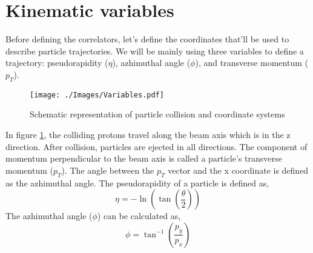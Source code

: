 \documentclass[12pt,a4paper,twoside]{report}
\begin{document}
\section{Kinematic variables}
Before defining the correlators, let's define the coordinates that'll be used to describe particle trajectories. We will be mainly using three variables to define a trajectory: pseudorapidity ($\eta$), azhimuthal angle ($\phi$), and transverse momentum ($p_T$).\\
\begin{figure}[H]
	\texttt{[image: ./Images/Variables.pdf]}
	\caption{Schematic representation of particle collision and coordinate systems}
	\label{fig:Variables}
\end{figure}
In figure \ref{fig:Variables}, the colliding protons travel along the beam axis which is in the z direction. After collision, particles are ejected in all directions. The component of momentum perpendicular to the beam axis is called a particle's transverse momentum ($p_T$). The angle between the $p_T$ vector and the x coordinate is defined as the azhimuthal angle. The pseudorapidity of a particle is defined as,
\[\eta=-\ln\left(\tan\left(\frac{\theta}{2}\right)\right)\]
The azhimuthal angle ($\phi$) can be calculated as,
\[\phi=\tan^{-1}\left(\frac{p_y}{p_x}\right)\]
\end{document}
